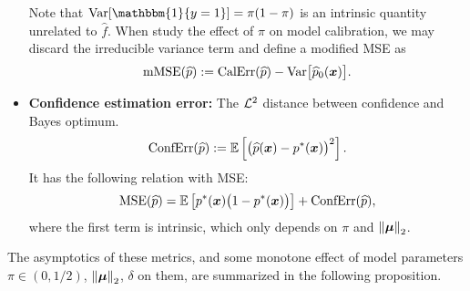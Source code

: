 \begin{itemize}
    Note that $\var[\mathbbm{1}\{ y = 1 \}] = \pi(1 - \pi)$ is an intrinsic quantity unrelated to $\hat f$. When study the effect of $\pi$ on model calibration, we may discard the irreducible variance term and define a modified MSE as
    \begin{equation*}
        \mathrm{mMSE}(\widehat p) := \mathrm{CalErr}(\widehat p) - \mathrm{Var} \bigl[ \widehat p_0(\text{\boldmath $x$}) \bigr].
    \end{equation*}
    \item \textbf{Confidence estimation error:} The $\mathcal{L}^2$ distance between confidence and Bayes optimum.
    \begin{equation*}
        \mathrm{ConfErr}(\widehat p) :=  \mathbb{E}\left[ \bigl( \widehat p(\text{\boldmath $x$}) - p^*(\text{\boldmath $x$}) \bigr)^2 \right]
        .
    \end{equation*}
    It has the following relation with MSE:
    \begin{equation}
    \label{eq:MSE_vs_ConfErr}
        \mathrm{MSE}(\widehat p) 
        =
        \mathbb{E} \left[ p^*(\text{\boldmath $x$}) \bigl( 1 - p^*(\text{\boldmath $x$}) \bigr) \right]
        + \mathrm{ConfErr}(\widehat p),
    \end{equation}
    where the first term is intrinsic, which only depends on $\pi$ and $\left\|{\text{\boldmath $\mu$}}\right\|_2$. 
    
\end{itemize}

The asymptotics of these metrics, and some monotone effect of model parameters $\pi \in (0, 1/2)$, $\left\|{\text{\boldmath $\mu$}}\right\|_2$, $\delta$ on them, are summarized in the following proposition.

